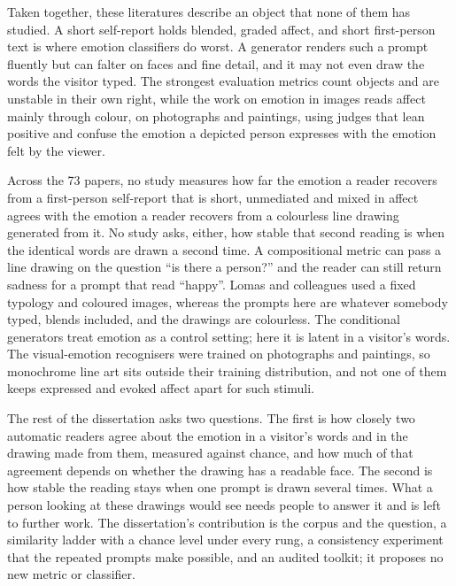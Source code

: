 Taken together, these literatures describe an object that none of them has studied. A short self-report holds blended, graded affect, and short first-person text is where emotion classifiers do worst. A generator renders such a prompt fluently but can falter on faces and fine detail, and it may not even draw the words the visitor typed. The strongest evaluation metrics count objects and are unstable in their own right, while the work on emotion in images reads affect mainly through colour, on photographs and paintings, using judges that lean positive and confuse the emotion a depicted person expresses with the emotion felt by the viewer.

Across the 73 papers, no study measures how far the emotion a reader recovers from a first-person self-report that is short, unmediated and mixed in affect agrees with the emotion a reader recovers from a colourless line drawing generated from it. No study asks, either, how stable that second reading is when the identical words are drawn a second time. A compositional metric can pass a line drawing on the question ``is there a person?'' and the reader can still return sadness for a prompt that read ``happy''. Lomas and colleagues used a fixed typology and coloured images, whereas the prompts here are whatever somebody typed, blends included, and the drawings are colourless. The conditional generators treat emotion as a control setting; here it is latent in a visitor's words. The visual-emotion recognisers were trained on photographs and paintings, so monochrome line art sits outside their training distribution, and not one of them keeps expressed and evoked affect apart for such stimuli.

The rest of the dissertation asks two questions. The first is how closely two automatic readers agree about the emotion in a visitor's words and in the drawing made from them, measured against chance, and how much of that agreement depends on whether the drawing has a readable face. The second is how stable the reading stays when one prompt is drawn several times. What a person looking at these drawings would see needs people to answer it and is left to further work. The dissertation's contribution is the corpus and the question, a similarity ladder with a chance level under every rung, a consistency experiment that the repeated prompts make possible, and an audited toolkit; it proposes no new metric or classifier.
